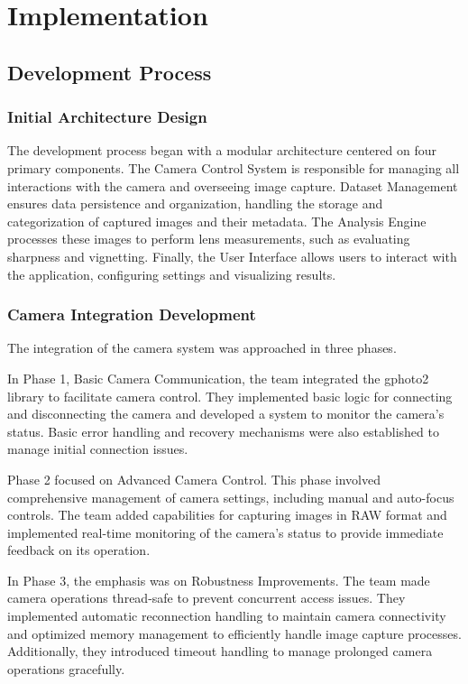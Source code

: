 \chapter{Implementation}

\section{Development Process}

\subsection{Initial Architecture Design}

The development process began with a modular architecture centered on four primary components. The Camera Control System is responsible for managing all interactions with the camera and overseeing image capture. Dataset Management ensures data persistence and organization, handling the storage and categorization of captured images and their metadata. The Analysis Engine processes these images to perform lens measurements, such as evaluating sharpness and vignetting. Finally, the User Interface allows users to interact with the application, configuring settings and visualizing results.

\subsection{Camera Integration Development}

The integration of the camera system was approached in three phases.

In Phase 1, Basic Camera Communication, the team integrated the gphoto2 library to facilitate camera control. They implemented basic logic for connecting and disconnecting the camera and developed a system to monitor the camera's status. Basic error handling and recovery mechanisms were also established to manage initial connection issues.

Phase 2 focused on Advanced Camera Control. This phase involved comprehensive management of camera settings, including manual and auto-focus controls. The team added capabilities for capturing images in RAW format and implemented real-time monitoring of the camera's status to provide immediate feedback on its operation.

In Phase 3, the emphasis was on Robustness Improvements. The team made camera operations thread-safe to prevent concurrent access issues. They implemented automatic reconnection handling to maintain camera connectivity and optimized memory management to efficiently handle image capture processes. Additionally, they introduced timeout handling to manage prolonged camera operations gracefully.

